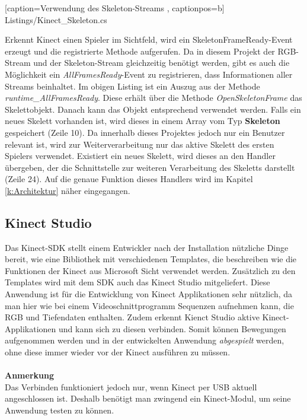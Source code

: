 
    [caption={Verwendung des Skeleton-Streams}
       \label{lst:kinect_skeleton_stream},
       captionpos=b]
{Listings/Kinect_Skeleton.cs}

\noindent
Erkennt Kinect einen Spieler im Sichtfeld, wird ein SkeletonFrameReady-Event erzeugt und die registrierte Methode aufgerufen. Da in diesem Projekt der RGB-Stream und der Skeleton-Stream gleichzeitig benötigt werden, gibt es auch die Möglichkeit ein \textit{AllFramesReady}-Event zu registrieren, dass Informationen aller Streams beinhaltet. Im obigen Listing ist ein Auszug aus der Methode \textit{runtime\_AllFramesReady}. Diese erhält über die Methode \textit{OpenSkeletonFrame} das Skelettobjekt. Danach kann das Objekt entsprechend verwendet werden. Falls ein neues Skelett vorhanden ist, wird dieses in einem Array vom Typ \textbf{Skeleton} gespeichert (Zeile 10). Da innerhalb dieses Projektes jedoch nur ein Benutzer relevant ist, wird zur Weiterverarbeitung nur das aktive Skelett des ersten Spielers verwendet. Existiert ein neues Skelett, wird dieses an den Handler übergeben, der die Schnittstelle zur weiteren Verarbeitung des Skeletts darstellt (Zeile 24). Auf die genaue Funktion dieses Handlers wird im Kapitel \ref{k:Architektur}  näher eingegangen.
%
%


\subsection{Kinect Studio}
Das Kinect-SDK stellt einem Entwickler nach der Installation nützliche Dinge bereit, wie eine Bibliothek mit verschiedenen Templates, die beschreiben wie die Funktionen der Kinect aus Microsoft Sicht verwendet werden. Zusätzlich zu den Templates wird mit dem SDK auch das Kinect Studio mitgeliefert. Diese Anwendung ist für die Entwicklung von Kinect Applikationen sehr nützlich, da man hier wie bei einem Videoschnittprogramm Sequenzen aufnehmen kann, die RGB und Tiefendaten enthalten. Zudem erkennt Kienct Studio aktive Kinect-Applikationen und kann sich zu diesen verbinden. Somit können Bewegungen aufgenommen werden und in der entwickelten Anwendung \textit{abgespielt} werden, ohne diese immer wieder vor der Kinect ausführen zu müssen.
\\ \\
\textbf{Anmerkung}\\
Das Verbinden funktioniert jedoch nur, wenn Kinect per USB aktuell angeschlossen ist. Deshalb benötigt man zwingend ein Kinect-Modul, um seine Anwendung testen zu können.